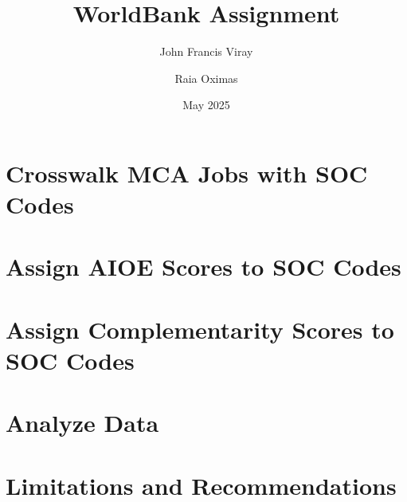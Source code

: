 \documentclass[11pt,a4paper,twocolumn]{article}
\title{WorldBank Assignment}
\author{John Francis Viray \and Raia Oximas}
\date{May 2025}
\begin{document}
\twocolumn[%
\maketitle
\begin{abstract}

\end{abstract}
\vspace{1em}
]

\section{Crosswalk MCA Jobs with SOC Codes}


\section{Assign AIOE Scores to SOC Codes}


\section{Assign Complementarity Scores to SOC Codes}


\section{Analyze Data}


\section{Limitations and Recommendations}


\end{document}
